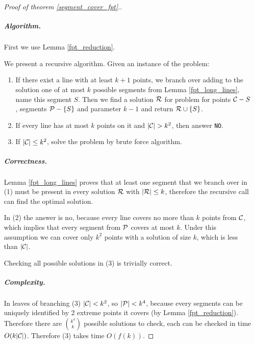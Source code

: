 \begin{proof}[Proof of theorem \ref{segment_cover_fpt}.]\leavevmode



\subparagraph{Algorithm.}
First we use Lemma \ref{fpt_reduction}.

We present a recursive algorithm. Given an instance of the problem:

\begin{enumerate}[label={(\arabic*)}]
\item If there exist a line with at least $k+1$ points, we branch over
adding to the solution one of at most $k$ possible segments
from Lemma \ref{fpt_long_lines}, name this segment $S$.
Then we find a solution $\mathcal{R}$
for problem for points $\mathcal{C} - S$, segments $\mathcal{P} - \{S\}$
and parameter $k-1$ and return $\mathcal{R} \cup \{S\}$.
\item If every line has at most $k$ points on it and $|\mathcal{C}| > k^2$,
then answer \texttt{NO}.
\item If $|\mathcal{C}| \le k^2$, solve the problem by brute force algorithm.
\end{enumerate}

\subparagraph{Correctness.}

Lemma \ref{fpt_long_lines} proves that at least one segment that we
branch over in (1) must be present in every solution $\mathcal{R}$ with $|\mathcal{R}| \le k$,
therefore the recursive call can find the optimal solution.

In (2) the answer is no, because every line covers no more than $k$ points
from $\mathcal{C}$, which implies that every segment from $\mathcal{P}$ covers at most
$k$. Under this assumption
we can cover only $k^2$ points with a solution of size $k$, which is less
than $|\mathcal{C}|$.

Checking all possible solutions in (3) is trivially correct.


\subparagraph{Complexity.}

In leaves of branching (3) $|\mathcal{C}| < k^2$, so $|\mathcal{P}| < k^4$, because
every segments can be uniquely identified by 2 extreme points it covers
(by Lemma \ref{fpt_reduction}). Therefore there are $\binom{k^4}{k}$
possible solutions to check, each can be checked in time $O(k|\mathcal{C}|)$.
Therefore (3) takes time $O(f(k))$.



\end{proof}
